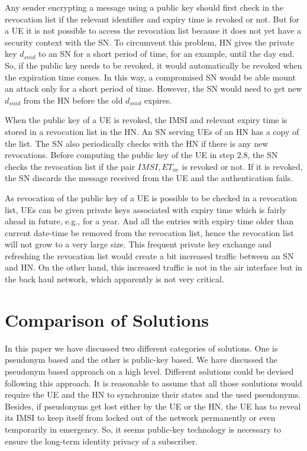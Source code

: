 \documentclass[runningheads,a4paper]{llncs} %
\begin{document}
Any sender encrypting a message using a public key should first check in the revocation list if the relevant identifier and expiry time is revoked or not. But for a UE it is not possible to access the revocation list because it does not yet have a security context with the SN. To circumvent this problem, HN gives the private key $d_{snid}$ to an SN for a short period of time, for an example, until the day end. So, if the public key needs to be revoked, it would automatically be revoked when the expiration time comes. In this way, a compromised SN would be able mount an attack only for a short period of time. However, the SN would need to get new $d_{snid}$ from the HN before the old $d_{snid}$ expires. 

When the public key of a UE is revoked, the IMSI and relevant expiry time is stored in a revocation list in the HN.  An SN serving UEs of an HN has a copy of the list. The SN also periodically checks with the HN if there is any new revocations. Before computing the public key of the UE in step $2.8$, the SN checks the revocation list if the pair $IMSI,ET_{ue}$ is revoked or not. If it is revoked, the SN discards the message received from the UE and the authentication fails. 

As revocation of the public key of a UE is possible to be checked in a revocation list, UEs can be given private keys associated with expiry time which is fairly ahead in future, e.g., for a year. And all the entries with expiry time older than current date-time be removed from the revocation list, hence the revocation list will not grow to a very large size. This frequent private key exchange and refreshing the revocation list would create a bit increased traffic between an SN and HN. On the other hand, this increased traffic is not in the air interface but in the back haul network, which apparently is not very critical. 


\section{Comparison of Solutions}
\label{sec:evaluation}
In this paper we have discussed two different categories of solutions. One is pseudonym based and the other is public-key based. We have discussed the pseudonym based approach on a high level. Different solutions could be devised following this approach. It is reasonable to assume that all those soulutions would require the UE and the HN to synchronize their states and the used pseudonyms. Besides, if pseudonyms get lost either by the UE or the HN, the UE has to reveal its IMSI to keep itself from locked out of the network permanently or even temporarily in emergency. So, it seems public-key technology is necessary to ensure the long-term identity privacy of a subscriber. 
\end{document}
